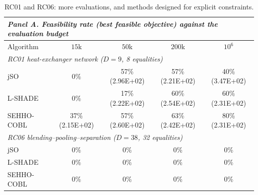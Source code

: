 \begin{table}[htbp]
\centering
\caption{RC01 and RC06: more evaluations, and methods designed for explicit constraints.}
\label{tab:engbudget}
\label{tab:solverbaseline}
\small
\setlength{\tabcolsep}{4.5pt}
\begin{tabular}{lcccc}
\toprule
\multicolumn{5}{l}{\emph{Panel A. Feasibility rate (best feasible objective) against the evaluation budget}} \\
\midrule
Algorithm & $15$k & $50$k & $200$k & $10^{6}$ \\
\midrule
\multicolumn{5}{l}{\textit{RC01 heat-exchanger network ($D{=}9$, 8 equalities)}} \\
\quad jSO & 0\% & 57\% (2.96E+02) & 57\% (2.21E+02) & 40\% (3.47E+02) \\
\quad L-SHADE & 0\% & 17\% (2.22E+02) & 60\% (2.54E+02) & 60\% (2.31E+02) \\
\quad SEHHO-COBL & 37\% (2.15E+02) & 57\% (2.60E+02) & 63\% (2.42E+02) & 80\% (2.31E+02) \\
\multicolumn{5}{l}{\textit{RC06 blending--pooling--separation ($D{=}38$, 32 equalities)}} \\
\quad jSO & 0\% & 0\% & 0\% & 0\% \\
\quad L-SHADE & 0\% & 0\% & 0\% & 0\% \\
\quad SEHHO-COBL & 0\% & 0\% & 0\% & 0\% \\
\bottomrule
\end{tabular}


\end{table}
